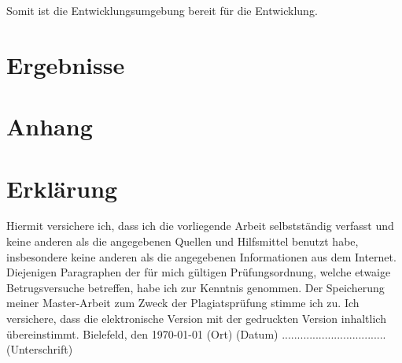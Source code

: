 \documentclass[
        ngerman,
        paper=a4,
        numbers=noendperiod,
]{scrreprt}
\begin{document}
Somit ist die Entwicklungsumgebung bereit für die Entwicklung.



\chapter{Ergebnisse}




\appendix 
\chapter{Anhang}
\label{chapter:Anhang}%


\clearpage
        
        
        




\chapter*{Erklärung}
Hiermit versichere ich, dass ich die vorliegende Arbeit selbstständig verfasst und keine anderen als die angegebenen Quellen und Hilfsmittel benutzt habe, insbesondere keine anderen als die angegebenen Informationen aus dem Internet. Diejenigen Paragraphen der für mich gültigen Prüfungsordnung, welche etwaige Betrugsversuche betreffen, habe ich zur Kenntnis genommen. Der Speicherung meiner Master-Arbeit zum Zweck der Plagiatsprüfung stimme ich zu. Ich versichere, dass die elektronische Version mit der gedruckten Version inhaltlich übereinstimmt.\newline
\linebreak
\linebreak
\linebreak
Bielefeld, den \today\newline
(Ort) (Datum)\newline
\linebreak
\linebreak
\linebreak
..................................\newline
(Unterschrift)
\end{document}
